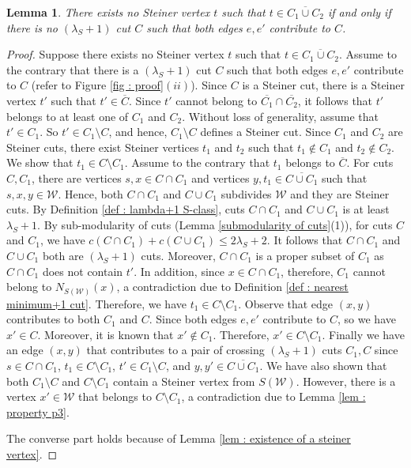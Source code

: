\documentclass[letterpaper,11pt]{article}
\newtheorem{lemma}{Lemma}[]
\begin{document}
\begin{lemma} \label{lem : sufficient condition}
    There exists no Steiner vertex $t$ such that $t\in \overline{C_1\cup C_2}$ if and only if there is no $(\lambda_S+1)$ cut $C$ such that both edges $e,e'$ contribute to $C$.
\end{lemma}
\begin{proof}
Suppose there exists no Steiner vertex $t$ such that $t\in \overline{C_1 \cup C_2}$. Assume to the contrary that there is a $(\lambda_S+1)$ cut $C$ such that both edges $e,e'$ contribute to $C$ (refer to Figure \ref{fig : proof}$(ii)$). Since $C$ is a Steiner cut, there is a Steiner vertex $t'$ such that $t'\in \overline{C}$. Since $t'$ cannot belong to $\overline{C_1}\cap \overline{C_2}$, it follows that $t'$ belongs to at least one of $C_1$ and $C_2$. Without loss of generality, assume that $t'\in C_1$. So $t'\in C_1\setminus C$, and hence, $C_1\setminus C$ defines a Steiner cut. Since $C_1$ and $C_2$ are Steiner cuts, there exist Steiner vertices $t_1$ and $t_2$ such that $t_1\notin C_1$ and $t_2\notin C_2$. We show that $t_1\in C\setminus C_1$. Assume to the contrary that $t_1$ belongs to $\overline{C}$. 
For cuts $C,C_1$, there are vertices $s,x\in C\cap C_1$ and vertices $y,t_1\in \overline{C\cup C_1}$ such that $s,x,y\in {\mathcal W}$. Hence, both $C\cap C_1$ and $C\cup C_1$ subdivides ${\mathcal W}$ and they are Steiner cuts. By Definition \ref{def : lambda+1 S-class}, cuts $C\cap C_1$ and $C\cup C_1$ is at least $\lambda_S+1$. By sub-modularity of cuts (Lemma \ref{submodularity of cuts}(1)), for cuts $C$ and $C_1$, we have $c(C\cap C_1)+c(C\cup C_1)\le 2\lambda_S+2$. It follows that $C\cap C_1$ and $C\cup C_1$ both are $(\lambda_S+1)$ cuts.  
Moreover, $C\cap C_1$ is a proper subset of $C_1$ as $C\cap C_1$ does not contain $t'$. In addition, since $x\in C\cap C_1$, therefore, $C_1$ cannot belong to $N_{S({\mathcal W})}(x)$, a contradiction due to Definition \ref{def : nearest minimum+1 cut}. Therefore, we have $t_1\in C\setminus C_1$. Observe that edge $(x,y)$ contributes to both $C_1$ and $C$. Since both edges $e,e'$ contribute to $C$, so we have $x'\in C$. Moreover, it is known that $x'\notin C_1$. Therefore, $x'\in C\setminus C_1$. Finally we have an edge $(x,y)$ that contributes to a pair of crossing $(\lambda_S+1)$ cuts $C_1,C$ since $s\in C\cap C_1$, $t_1\in C\setminus C_1$, $t'\in C_1\setminus C$, and $y,y'\in \overline{C\cup C_1}$. We have also shown that both $C_1\setminus C$ and $C\setminus C_1$ contain a Steiner vertex from $S({\mathcal W})$. However, there is a vertex $x'\in {\mathcal W}$ that belongs to $C\setminus C_1$, a contradiction due to Lemma \ref{lem : property p3}.

The converse part holds because of Lemma \ref{lem : existence of a steiner vertex}.
\end{proof}
\end{document}
